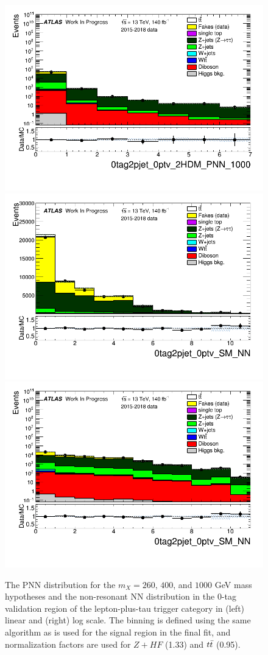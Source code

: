\begin{figure}
\includegraphics[width=.45\textwidth]{DiHiggs/plots/lephadFF/LTT/0tag2pjet_0ptv_2HDM_PNN_1000_LTT_ALLFAKES_Bulb_noNeg_log.png}\\
\includegraphics[width=.45\textwidth]{DiHiggs/plots/lephadFF/LTT/0tag2pjet_0ptv_SM_NN_LTT_ALLFAKES_Bulb_noNeg_lin.png}
\includegraphics[width=.45\textwidth]{DiHiggs/plots/lephadFF/LTT/0tag2pjet_0ptv_SM_NN_LTT_ALLFAKES_Bulb_noNeg_log.png}
\caption{The PNN distribution for the $m_{X} = 260$, $400$, and $1000$ GeV mass hypotheses and the non-resonant NN distribution in the $0$-tag validation region of the lepton-plus-tau trigger category in (left) linear and (right) log scale. The binning is defined using the same algorithm as is used for the signal region in the final fit, and normalization factors are used for $Z+HF$ (1.33) and $t\bar{t}$ (0.95).}
\label{fig:LTT_0tag}
\end{figure}    

